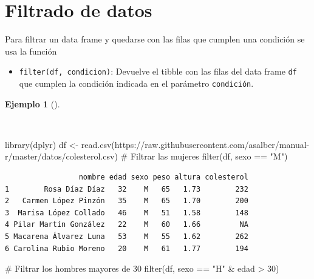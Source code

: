 \documentclass[
  spanish,
  a4paper,
]{scrreport}
\newenvironment{Shaded}{\begin{snugshade}}{\end{snugshade}}
\newcommand{\CommentTok}[1]{\textcolor[rgb]{0.37,0.37,0.37}{#1}}
\newcommand{\DecValTok}[1]{\textcolor[rgb]{0.68,0.00,0.00}{#1}}
\newcommand{\FunctionTok}[1]{\textcolor[rgb]{0.28,0.35,0.67}{#1}}
\newcommand{\NormalTok}[1]{\textcolor[rgb]{0.00,0.23,0.31}{#1}}
\newcommand{\OtherTok}[1]{\textcolor[rgb]{0.00,0.23,0.31}{#1}}
\newcommand{\SpecialCharTok}[1]{\textcolor[rgb]{0.37,0.37,0.37}{#1}}
\newcommand{\StringTok}[1]{\textcolor[rgb]{0.13,0.47,0.30}{#1}}
\providecommand{\tightlist}{%
  \setlength{\itemsep}{0pt}\setlength{\parskip}{0pt}}
\theoremstyle{definition}
\theoremstyle{definition}
\newtheorem{example}{Ejemplo}[chapter]
\theoremstyle{remark}
\begin{document}
\section{Filtrado de datos}\label{filtrado-de-datos}

Para filtrar un data frame y quedarse con las filas que cumplen una
condición se usa la función

\begin{itemize}
\tightlist
\item
  \texttt{filter(df,\ condicion)}: Devuelve el tibble con las filas del
  data frame \texttt{df} que cumplen la condición indicada en el
  parámetro \texttt{condición}.
\end{itemize}

\begin{example}[]\protect\hypertarget{exm-filter}{}\label{exm-filter}

~

\begin{Shaded}
\begin{Highlighting}[]
\FunctionTok{library}\NormalTok{(dplyr)}
\NormalTok{df }\OtherTok{\textless{}{-}} \FunctionTok{read.csv}\NormalTok{(}\StringTok{\textquotesingle{}https://raw.githubusercontent.com/asalber/manual{-}r/master/datos/colesterol.csv\textquotesingle{}}\NormalTok{)}
\CommentTok{\# Filtrar las mujeres}
\FunctionTok{filter}\NormalTok{(df, sexo }\SpecialCharTok{==} \StringTok{"M"}\NormalTok{)}
\end{Highlighting}
\end{Shaded}

\begin{verbatim}
                 nombre edad sexo peso altura colesterol
1        Rosa Díaz Díaz   32    M   65   1.73        232
2   Carmen López Pinzón   35    M   65   1.70        200
3  Marisa López Collado   46    M   51   1.58        148
4 Pilar Martín González   22    M   60   1.66         NA
5 Macarena Álvarez Luna   53    M   55   1.62        262
6 Carolina Rubio Moreno   20    M   61   1.77        194
\end{verbatim}

\begin{Shaded}
\begin{Highlighting}[]
\CommentTok{\# Filtrar los hombres mayores de 30 }
\FunctionTok{filter}\NormalTok{(df, sexo }\SpecialCharTok{==} \StringTok{"H"} \SpecialCharTok{\&}\NormalTok{ edad }\SpecialCharTok{\textgreater{}} \DecValTok{30}\NormalTok{)}
\end{Highlighting}
\end{Shaded}


\end{example}
\end{document}
